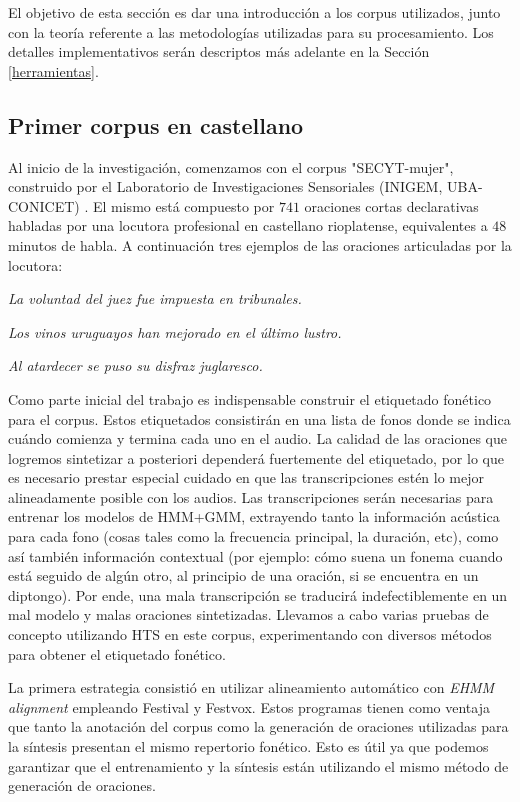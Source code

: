 El objetivo de esta sección es dar una introducción a los corpus utilizados, junto con la teoría referente a las metodologías utilizadas para su procesamiento. Los detalles implementativos serán descriptos más adelante en la Sección \ref{herramientas}.

\subsection{Primer corpus en castellano}

Al inicio de la investigación, comenzamos con el corpus "SECYT-mujer", construido por el Laboratorio de Investigaciones Sensoriales (INIGEM, UBA-CONICET) \cite{secytMujer}. El mismo está compuesto por $741$ oraciones cortas declarativas habladas por una locutora profesional en castellano rioplatense, equivalentes a $48$ minutos de habla. A continuación tres ejemplos de las oraciones articuladas por la locutora:

\indent\indent \textit{La voluntad del juez fue impuesta en tribunales.}

\indent\indent \textit{Los vinos uruguayos han mejorado en el último lustro.}

\indent\indent \textit{Al atardecer se puso su disfraz juglaresco.}

Como parte inicial del trabajo es indispensable construir el etiquetado fonético para el corpus. Estos etiquetados consistirán en una lista de fonos donde se indica cuándo comienza y termina cada uno en el audio. La calidad de las oraciones que logremos sintetizar a posteriori dependerá fuertemente del etiquetado, por lo que es necesario prestar especial cuidado en que las transcripciones estén lo mejor alineadamente posible con los audios. Las transcripciones serán necesarias para entrenar los modelos de HMM+GMM, extrayendo tanto la información acústica para cada fono (cosas tales como la frecuencia principal, la duración, etc), como así también información contextual (por ejemplo: cómo suena un fonema cuando está seguido de algún otro, al principio de una oración, si se encuentra en un diptongo). Por ende, una mala transcripción se traducirá indefectiblemente en un mal modelo y malas oraciones sintetizadas. Llevamos a cabo varias pruebas de concepto utilizando HTS en este corpus, experimentando con diversos métodos para obtener el etiquetado fonético. 

La primera estrategia consistió en utilizar alineamiento automático con \textit{EHMM alignment} \cite{phoneticCapturing} empleando Festival y Festvox. Estos programas tienen como ventaja que tanto la anotación del corpus como la generación de oraciones utilizadas para la síntesis presentan el mismo repertorio fonético. Esto es útil ya que podemos garantizar que el entrenamiento y la síntesis están utilizando el mismo método de generación de oraciones.

